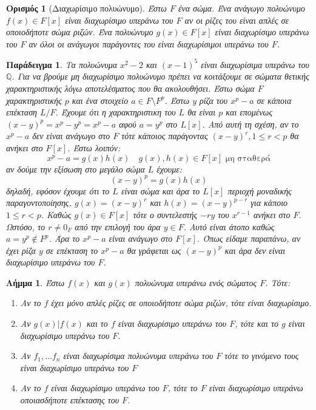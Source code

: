 \documentclass[oneside,a4paper]{article}
\newtheorem{lemma}{Λήμμα}
\newtheorem{example}{Παράδειγμα}
\newtheorem*{defn}{Ορισμός}
\newcommand{\Q}{\mathbb{Q}}
\begin{document}
\begin{defn}[Διαχωρίσιμο πολυώνυμο]
	Έστω $F$ ένα σώμα. Ένα ανάγωγο πολυώνυμο $f(x) \in F[x]$ είναι διαχωρίσιμο υπεράνω του $F$ αν οι ρίζες του είναι απλές σε οποιοδήποτε σώμα ριζών. Ένα πολυώνυμο $g(x) \in F[x]$ είναι διαχωρίσιμο υπεράνω του $F$ αν όλοι οι ανάγωγοι παράγοντες του είναι διαχωρίσιμοι υπεράνω του $F$.
\end{defn}
\vspace{0.1cm}
\begin{example}
	Τα πολυώνυμα $x^2 - 2$ και $(x-1)^5$ είναι διαχωρίσιμα υπεράνω του $\Q$. Για να βρούμε μη διαχωρίσιμο πολυώνυμο πρέπει να κοιτάξουμε σε σώματα θετικής χαρακτηριστικής λόγω αποτελέσματος που θα ακολουθήσει. Έστω σώμα $F$ χαρακτηριστικής $p$ και ένα στοιχείο $a \in F \setminus F^p$. Έστω $y$ ρίζα του $x^p - a$ σε κάποια επέκταση $L/F$. Έχουμε ότι η χαρακτηριστικη του $L$ θα είναι $p$ και επομένως $(x-y)^p = x^p - y^p = x^p - a$ αφού $a = y^p$ στο $L[x]$. Από αυτή τη σχέση, αν το $x^p -a$ δεν είναι ανάγωγο στο $F$ τότε κάποιος παράγοντας $(x-y)^r , 1\leq r < p$ θα ανήκει στο $F[x]$. Έστω λοιπόν:
	$$x^p - a = g(x) h(x) \quad g(x),h(x) \in F[x] \text{ μη σταθερά}$$
	αν δούμε την εξίσωση στο μεγάλο σώμα $L$ έχουμε:
	$$(x-y)^p = g(x)h(x)$$
	δηλαδή, εφόσον έχουμε ότι το $L$ είναι σώμα και άρα το $L[x]$ περιοχή μοναδικής παραγοντοποίησης, $g(x) = (x-y)^r$ και $h(x) = (x-y)^{p-r}$ για κάποιο $1\leq r < p$. Καθώς $g(x) \in F[x]$ τότε ο συντελεστής $-ry$ του $x^{r-1}$ ανήκει στο $F$. Ωστόσο, το $r\neq 0_F$ από την επιλογή του άρα $y \in F$. Αυτό είναι άτοπο καθώς $a = y^p \not\in F^p$. Άρα το $x^p - a$ είναι ανάγωγο στο $F[x]$. Όπως είδαμε παραπάνω, αν έχει ρίζα $y$ σε επέκταση το $x^p -a$ θα γράφεται ως $(x-y)^p$ και άρα δεν είναι διαχωρίσιμο υπεράνω του $F$. 

\end{example}
\vspace{0.1cm}
\begin{lemma}
	\label{tessera tria}
	Έστω $f(x)$ και $g(x)$ πολυώνυμα υπεράνω ενός σώματος $F$. Τότε:
	\begin{enumerate}
		\item Αν το $f$ έχει μόνο απλές ρίζες σε οποιοδήποτε σώμα ριζών, τότε είναι διαχωρίσιμο.
		\item Αν $g(x) | f(x)$ και το $f$ είναι διαχωρίσιμο υπεράνω του $F$, τότε και το $g$ είναι διαχωρίσιμο υπεράνω του $F$.
		\item  Αν $f_1 , \ldots f_n$ είναι διαχωρίσιμα πολυώνυμα υπεράνω του $F$ τότε το γινόμενο τους είναι διαχωρίσιμο υπεράνω του $F$
		\item  Αν το $f$ είναι διαχωρίσιμο υπεράνω του $F$, τότε το $F$ είναι διαχωρίσιμο υπεράνω οποιασδήποτε επέκτασης του $F$.
	\end{enumerate}

\end{lemma}
\end{document}
